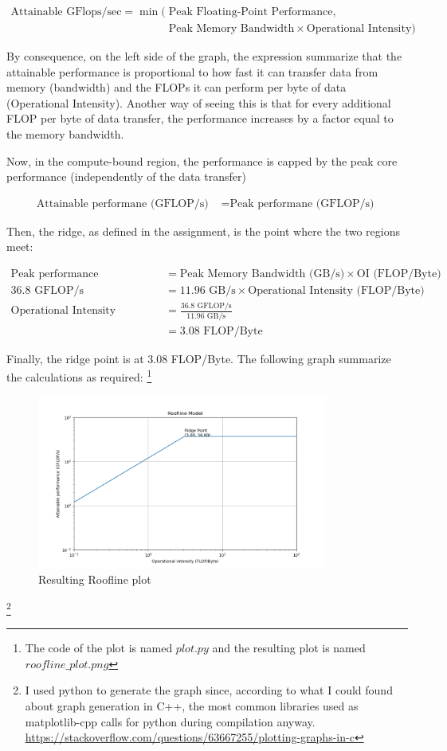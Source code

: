 \documentclass[unicode,11pt,a4paper,oneside,numbers=endperiod,openany]{scrartcl}
\begin{document}
\begin{align*}
    \text{Attainable GFlops/sec} = \min(&\text{Peak Floating-Point Performance},\\
    &\text{Peak Memory Bandwidth} \times \text{Operational Intensity})
\end{align*}

By consequence, on the left side of the graph, the expression summarize that the attainable performance is proportional to how fast it can transfer data from memory (bandwidth) and the FLOPs it can perform per byte of data (Operational Intensity).
Another way of seeing this is that for every additional FLOP per byte of data transfer, the performance increases by a factor equal to the memory bandwidth. 


Now, in the compute-bound region, the performance is capped by the peak core performance (independently of the data transfer)

\begin{align*}
    \text{Attainable performane (GFLOP/s) } &= \text{Peak performane (GFLOP/s) }
\end{align*}

Then, the ridge, as defined in the assignment, is the point where the two regions meet:

\begin{align*}
    \text{Peak performance (GFLOP/s)} &= \text{Peak Memory Bandwidth (GB/s)} \times \text{OI (FLOP/Byte)} \\
    36.8 \text{ GFLOP/s} &= 11.96 \text{ GB/s} \times \text{Operational Intensity (FLOP/Byte)} \\
    \text{Operational Intensity (FLOP/Byte)} &= \frac{36.8 \text{ GFLOP/s}}{11.96 \text{ GB/s}} \\
    &= 3.08 \text{ FLOP/Byte}
\end{align*}

Finally, the ridge point is at 3.08 FLOP/Byte. The following graph summarize the calculations as required: 
\footnote{The code of the plot is named $plot.py$ and the resulting plot is named $roofline\_plot.png$}

\begin{figure}[H]
    \centering
    \includegraphics[width=0.85\textwidth]{./exercise2/roofline_plot.png}
    \caption{Resulting Roofline plot} 
\end{figure}
\footnote{I used python to generate the graph since, according to what I could found about graph generation in C++, 
the most common libraries used as matplotlib-cpp calls for python during compilation anyway. \url{https://stackoverflow.com/questions/63667255/plotting-graphs-in-c}}
\end{document}
